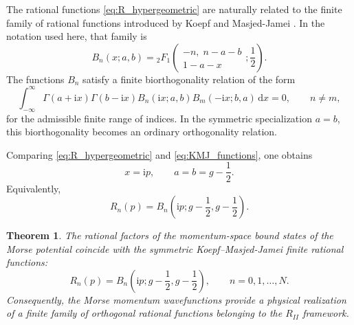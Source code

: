 \documentclass[10pt,a4paper]{amsart}
\newcommand{\ii}{\mathrm{i}}
\newcommand{\dd}{\mathrm{d}}
\numberwithin{equation}{section}
\newtheorem{theorem}{Theorem}[section]
\begin{document}
The rational functions \eqref{eq:R_hypergeometric} are naturally related to the finite family of
rational functions introduced by Koepf and Masjed-Jamei \cite{KoepfMasjedJamei2007}.  In the
notation used here, that family is
\begin{equation}
  B_n(x;a,b)=
  {}_2F_1\!\left(
  \begin{matrix}
  -n,\; n-a-b\\
  1-a-x
  \end{matrix};\frac12
  \right).
  \label{eq:KMJ_functions}
\end{equation}
The functions $B_n$ satisfy a finite biorthogonality relation of the form
\begin{equation}
  \int_{-\infty}^{\infty}
  \Gamma(a+\ii x)\Gamma(b-\ii x)
  B_n(\ii x;a,b)B_m(-\ii x;b,a)\,\dd x=0,
  \qquad n\ne m,
  \label{eq:KMJ_biorthogonality}
\end{equation}
for the admissible finite range of indices.  In the symmetric specialization $a=b$, this
biorthogonality becomes an ordinary orthogonality relation.

Comparing \eqref{eq:R_hypergeometric} and \eqref{eq:KMJ_functions}, one obtains
\begin{equation}
  x=\ii p,
  \qquad a=b=g-\frac12.
  \label{eq:parameter_identification}
\end{equation}
Equivalently,
\begin{equation}
  R_n(p)=B_n\!\left(\ii p;g-\frac12,g-\frac12\right).
  \label{eq:R_B_identification}
\end{equation}

\begin{theorem}\label{thm:main_identification}
The rational factors of the momentum-space bound states of the Morse potential coincide with the
symmetric Koepf--Masjed-Jamei finite rational functions:
\begin{equation}
  R_n(p)=B_n\!\left(\ii p;g-\frac12,g-\frac12\right),
  \qquad n=0,1,\dots,N.
\end{equation}
Consequently, the Morse momentum wavefunctions provide a physical realization of a finite family
of orthogonal rational functions belonging to the $R_{II}$ framework.
\end{theorem}
\end{document}
